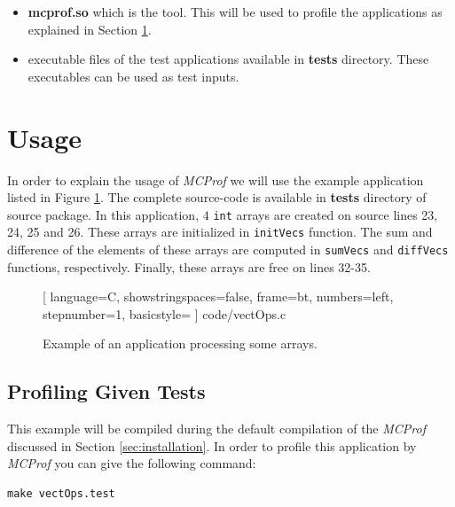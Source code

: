 \documentclass[11pt]{article}
\newcommand{\MCPROF}{\emph{MCProf}}
\begin{document}
\begin{itemize}

\item \textbf{mcprof.so} which is the tool. This will be used to profile the
    applications as explained in Section \ref{sec:usage}.

\item executable files of the test applications available in \textbf{tests}
    directory.  These executables can be used as test inputs.

\end{itemize}



\section{Usage}
\label{sec:usage}

In order to explain the usage of \MCPROF{} we will use the example application
listed in Figure \ref{fig:vectOps}. The complete source-code is available in
\textbf{tests} directory of source package. In this application, $4$ \verb|int|
arrays are created on source lines 23, 24, 25 and 26. These arrays are
initialized in \verb|initVecs| function. The sum and difference of the elements
of these arrays are computed in \verb|sumVecs| and \verb|diffVecs| functions,
respectively.  Finally, these arrays are free on lines 32-35.

\begin{figure} %
    \centering
%     
    
    [
    language=C,
    showstringspaces=false,
    frame=bt,
    numbers=left,
    stepnumber=1,
    basicstyle=\small %
    ] {code/vectOps.c}
    \caption{Example of an application processing some arrays.}
    \label{fig:vectOps}
\end{figure}


\subsection{Profiling Given Tests}

This example will be compiled during the default compilation of the \MCPROF{}
discussed in Section \ref{sec:installation}. In order to profile this
application by \MCPROF{} you can give the following command:

{
\small
\begin{Verbatim}[frame=single]
make vectOps.test
\end{Verbatim}
}
\end{document}
